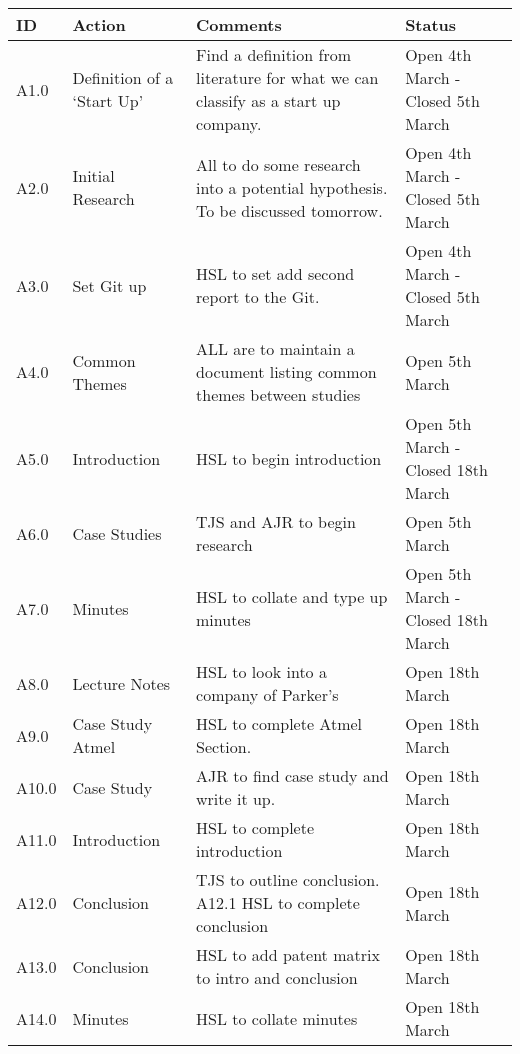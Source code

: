 \begin{center}
\begin{longtable}{| p{} | >{\raggedright\arraybackslash}p{} |  p{} | >{\raggedright\arraybackslash}p{}|} \hline
\textbf{ID} & \textbf{Action} & \textbf{Comments} & \textbf{Status} \\ \hline
\endhead
A1.0	&	Definition of a `Start Up'	&	Find a definition from literature for what we can classify as a start up company.	& Open 4th March - Closed 5th March \\ \hline
A2.0	&	Initial Research	&	All to do some research into a potential hypothesis. To be discussed tomorrow.	&	Open 4th March - Closed 5th March\\ \hline
A3.0	&	Set Git up	&	HSL to set add second report to the Git.	&	Open 4th March	- Closed 5th March\\ \hline	
A4.0	&	Common Themes	&	ALL are to maintain a document listing common themes between studies & Open 5th March \\ \hline
A5.0	&	Introduction	&	HSL to begin introduction	&	Open 5th March - Closed 18th March \\ \hline
A6.0	&	Case Studies	&	TJS and AJR to begin research & Open 5th March \\ \hline
A7.0	&	Minutes		& 	HSL to collate and type up minutes & Open 5th March - Closed 18th March \\ \hline
A8.0 	&	Lecture Notes 	& 	HSL to look into a company of Parker's & Open 18th March \\ \hline
A9.0	&	Case Study Atmel & 	HSL to complete Atmel Section. & Open 18th March \\ \hline
A10.0   & 	Case Study 	&	AJR to find case study and write it up. & Open 18th March \\ \hline
A11.0 	&	Introduction 	& 	HSL to complete introduction & Open 18th March \\ \hline
A12.0 	& 	Conclusion 	&	TJS to outline conclusion. A12.1 HSL to complete conclusion & Open 18th March \\ \hline
A13.0 	&	Conclusion	&	HSL to add patent matrix to intro and conclusion & Open 18th March \\ \hline
A14.0 	&	Minutes		& 	HSL to collate minutes & Open 18th March \\ \hline
\end{longtable}
\end{center}

